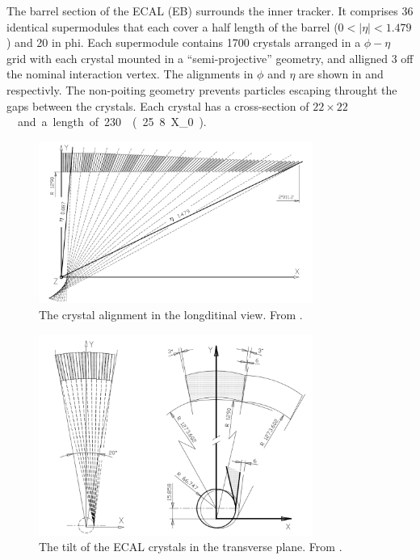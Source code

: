 The barrel section of the ECAL (EB) surrounds the inner tracker. It comprises
36 identical supermodules that each cover a half length of the barrel
($0<|\eta|<1.479$) and \unit{20}{\degree} in phi. Each supermodule contains
1700 crystals arranged in a $\phi - \eta$ grid with each crystal mounted in a
``semi-projective'' geometry, and alligned \unit{3}{\degree} off the
nominal interaction vertex.
The alignments in $\phi$ and $\eta$ are shown in  and
 respectivly. The non-poiting geometry 
 prevents particles escaping throught the gaps between the crystals.
Each crystal has a cross-section of
\unit{$22 \times 22$}{\mm\squared} and a length of
\unit{230}{\mm} (\unit{25.8}{X_0}).

\begin{figure}[htbp]
  \centering
  \includegraphics[width=0.8\textwidth]{crystallong}
  \caption{The crystal alignment in the longditinal view. From \cite{ecaltdr}. }
  \label{fig:crystallong}
\end{figure}

\begin{figure}[htbp]
  \centering
  \includegraphics[width=0.8\textwidth]{crystaltilt}
  \caption{The tilt of the ECAL crystals in the transverse plane. From \cite{ecaltdr}. }
  \label{fig:crystaltilt}
\end{figure}

